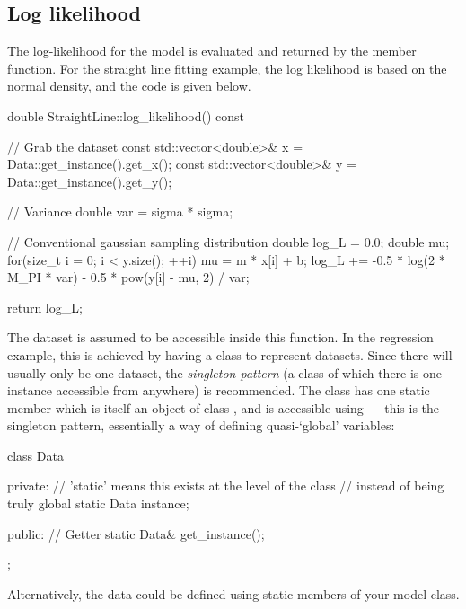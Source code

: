 \documentclass[article, nojss]{jss}
\begin{document}
\subsection{Log likelihood}
The log-likelihood for the model is evaluated and returned by the
 member function. For the straight line
fitting example, the log likelihood is based on the
normal density, and the code is given below.
\begin{CodeChunk}
\begin{CodeInput}
double StraightLine::log_likelihood() const
{
    // Grab the dataset
    const std::vector<double>& x = Data::get_instance().get_x();
    const std::vector<double>& y = Data::get_instance().get_y();

    // Variance
    double var = sigma * sigma;

    // Conventional gaussian sampling distribution
    double log_L = 0.0;
    double mu;
    for(size_t i = 0; i < y.size(); ++i)
    {
        mu = m * x[i] + b;
        log_L += -0.5 * log(2 * M_PI * var) - 0.5 * pow(y[i] - mu, 2) / var;
    }

    return log_L;
}
\end{CodeInput}
\end{CodeChunk}
The dataset is assumed to be accessible inside this function. In the
regression example, this is achieved by having a
 class to represent
datasets. Since there will usually only be one dataset,
the {\em singleton pattern} (a class of which there is one instance
accessible from anywhere) is recommended.
The  class has
one static member which is itself an object of class , and is
accessible using  --- this is the singleton pattern,
essentially a way of defining quasi-`global' variables:

\begin{CodeChunk}
\begin{CodeInput}
class Data
{
    private:
        // 'static' means this exists at the level of the class
        // instead of being truly global
        static Data instance;

    public:
        // Getter
        static Data& get_instance();
};
\end{CodeInput}
\end{CodeChunk}

Alternatively, the data could be defined using static members of your
model class.
\end{document}
